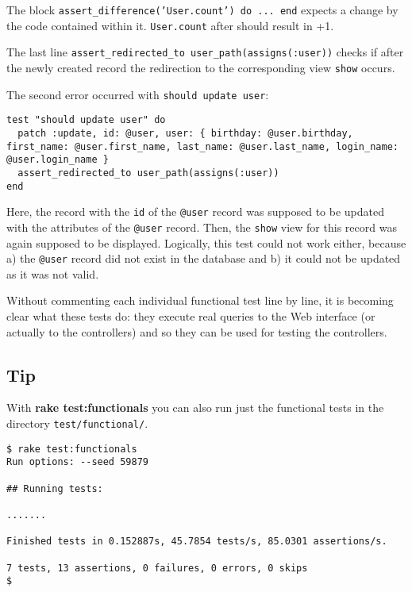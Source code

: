 \documentclass[a4paper]{book}
\newcounter{tab}[chapter]
\begin{document}
The block \texttt{assert\_difference('User.count') do ... end} expects a change by the code contained within it. \texttt{User.count} after should result in +1.

The last line \texttt{assert\_redirected\_to       user\_path(assigns(:user))} checks if after the newly created record the redirection to the corresponding view \texttt{show} occurs.

The second error occurred with \texttt{should update       user}:

\begin{shaded}\begin{verbatim}
test "should update user" do
  patch :update, id: @user, user: { birthday: @user.birthday, first_name: @user.first_name, last_name: @user.last_name, login_name: @user.login_name }
  assert_redirected_to user_path(assigns(:user))
end
\end{verbatim}\end{shaded}

Here, the record with the \texttt{id} of the \texttt{@user} record was supposed to be updated with the attributes of the \texttt{@user} record. Then, the \texttt{show} view for this record was again supposed to be displayed. Logically, this test could not work either, because a) the \texttt{@user} record did not exist in the database and b) it could not be updated as it was not valid.

Without commenting each individual functional test line by line, it is becoming clear what these tests do: they execute real queries to the Web interface (or actually to the controllers) and so they can be used for testing the controllers.

\subsection{Tip}\label{tip-15}

With \textbf{rake test:functionals} you can also run just the functional tests in the directory \texttt{test/functional/}.

\begin{shaded}\begin{verbatim}
$ rake test:functionals
Run options: --seed 59879

## Running tests:

.......

Finished tests in 0.152887s, 45.7854 tests/s, 85.0301 assertions/s.

7 tests, 13 assertions, 0 failures, 0 errors, 0 skips
$
\end{verbatim}\end{shaded}
\end{document}
